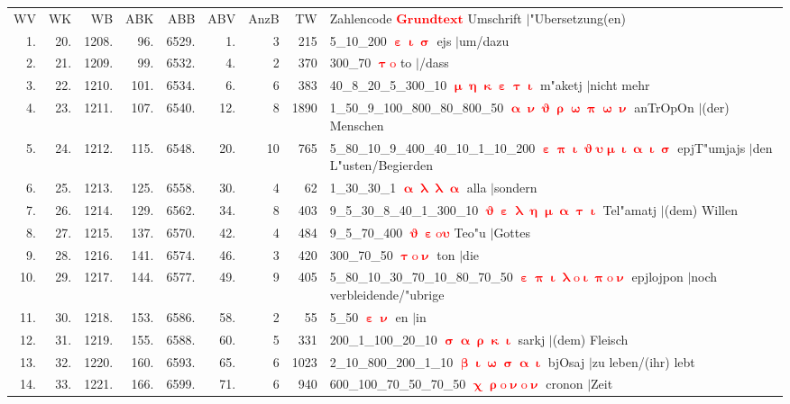 \documentclass[a4paper,10pt,landscape]{article}
\begin{document}
\begin{tabular}{rrrrrrrrp{120mm}}
WV&WK&WB&ABK&ABB&ABV&AnzB&TW&Zahlencode \textcolor{red}{$\boldsymbol{Grundtext}$} Umschrift $|$"Ubersetzung(en)\\
1.&20.&1208.&96.&6529.&1.&3&215&5\_10\_200 \textcolor{red}{$\boldsymbol{\upepsilon\upiota\upsigma}$} ejs $|$um/dazu\\
2.&21.&1209.&99.&6532.&4.&2&370&300\_70 \textcolor{red}{$\boldsymbol{\uptau\mathrm{o}}$} to $|$/dass\\
3.&22.&1210.&101.&6534.&6.&6&383&40\_8\_20\_5\_300\_10 \textcolor{red}{$\boldsymbol{\upmu\upeta\upkappa\upepsilon\uptau\upiota}$} m"aketj $|$nicht mehr\\
4.&23.&1211.&107.&6540.&12.&8&1890&1\_50\_9\_100\_800\_80\_800\_50 \textcolor{red}{$\boldsymbol{\upalpha\upnu\upvartheta\uprho\upomega\uppi\upomega\upnu}$} anTrOpOn $|$(der) Menschen\\
5.&24.&1212.&115.&6548.&20.&10&765&5\_80\_10\_9\_400\_40\_10\_1\_10\_200 \textcolor{red}{$\boldsymbol{\upepsilon\uppi\upiota\upvartheta\upsilon\upmu\upiota\upalpha\upiota\upsigma}$} epjT"umjajs $|$den L"usten/Begierden\\
6.&25.&1213.&125.&6558.&30.&4&62&1\_30\_30\_1 \textcolor{red}{$\boldsymbol{\upalpha\uplambda\uplambda\upalpha}$} alla $|$sondern\\
7.&26.&1214.&129.&6562.&34.&8&403&9\_5\_30\_8\_40\_1\_300\_10 \textcolor{red}{$\boldsymbol{\upvartheta\upepsilon\uplambda\upeta\upmu\upalpha\uptau\upiota}$} Tel"amatj $|$(dem) Willen\\
8.&27.&1215.&137.&6570.&42.&4&484&9\_5\_70\_400 \textcolor{red}{$\boldsymbol{\upvartheta\upepsilon\mathrm{o}\upsilon}$} Teo"u $|$Gottes\\
9.&28.&1216.&141.&6574.&46.&3&420&300\_70\_50 \textcolor{red}{$\boldsymbol{\uptau\mathrm{o}\upnu}$} ton $|$die\\
10.&29.&1217.&144.&6577.&49.&9&405&5\_80\_10\_30\_70\_10\_80\_70\_50 \textcolor{red}{$\boldsymbol{\upepsilon\uppi\upiota\uplambda\mathrm{o}\upiota\uppi\mathrm{o}\upnu}$} epjlojpon $|$noch verbleidende/"ubrige\\
11.&30.&1218.&153.&6586.&58.&2&55&5\_50 \textcolor{red}{$\boldsymbol{\upepsilon\upnu}$} en $|$in\\
12.&31.&1219.&155.&6588.&60.&5&331&200\_1\_100\_20\_10 \textcolor{red}{$\boldsymbol{\upsigma\upalpha\uprho\upkappa\upiota}$} sarkj $|$(dem) Fleisch\\
13.&32.&1220.&160.&6593.&65.&6&1023&2\_10\_800\_200\_1\_10 \textcolor{red}{$\boldsymbol{\upbeta\upiota\upomega\upsigma\upalpha\upiota}$} bjOsaj $|$zu leben/(ihr) lebt\\
14.&33.&1221.&166.&6599.&71.&6&940&600\_100\_70\_50\_70\_50 \textcolor{red}{$\boldsymbol{\upchi\uprho\mathrm{o}\upnu\mathrm{o}\upnu}$} cronon $|$Zeit\\
\end{tabular}\medskip \\
\end{document}
